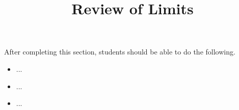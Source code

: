 \documentclass{ximera}
\title{Review of Limits}
\begin{document}
\begin{abstract} 
\end{abstract}

\maketitle

\begin{sectionOutcomes}
After completing this section, students should be able to do the following.

\begin{itemize}
	\item ...
	\item ...
	\item ...
\end{itemize}
\end{sectionOutcomes}
\end{document}
